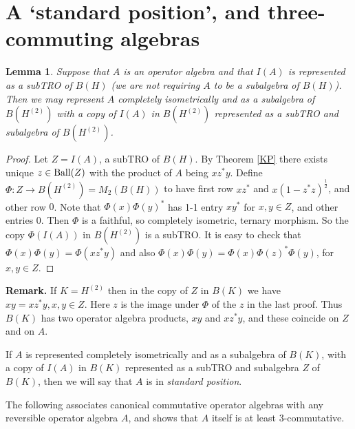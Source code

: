\documentclass{amsart}
\newtheorem{lemma}[theorem]{Lemma}
\theoremstyle{remark}
\theoremstyle{definition}
\numberwithin{equation}{section}
\begin{document}
\section{A `standard position', and three-commuting algebras}  \label{sp}

\begin{lemma} \label{both} Suppose that $A$ is an operator algebra and that $I(A)$ is represented as a subTRO of $B(H)$
(we are not requiring $A$ to be a subalgebra of $B(H)$).  Then 
we may represent $A$ completely isometrically and as a subalgebra of $B(H^{(2)})$ with a copy  of 
$I(A)$ in $B(H^{(2)})$ represented as a subTRO  and  subalgebra of $B(H^{(2)})$. \end{lemma}

\begin{proof}  Let $Z = I(A)$, a subTRO of $B(H)$.  By Theorem \ref{KP} there exists unique $z \in {\rm Ball}(Z)$ with
the product of $A$ being $x z^* y$. 
Define $\Phi : Z \to B(H^{(2)}) = M_2(B(H))$ to have first row $x z^*$ and $x(1-z^*z)^{\frac{1}{2}}$, and other row $0$.
Note that $\Phi(x) \Phi(y)^*$ has 1-1 entry $xy^*$ for $x,y \in Z$, and other entries 0.  Then $\Phi$ is a faithful, so  completely isometric, ternary morphism.  So the copy $\Phi(I(A))$  in $B(H^{(2)})$ is a subTRO. 
It is easy to check that $\Phi(x) \Phi(y) = \Phi(xz^* y)$ and also $\Phi(x) \Phi(y) =  \Phi(x) \Phi(z)^* \Phi(y)$, for $x,y \in Z$.
\end{proof}

{\bf Remark.}  If $K = H^{(2)}$   then in the copy of $Z$ in  $B(K)$ we have $xy = x z^* y, x, y \in Z$.   
Here $z$ is the image under $\Phi$ of the $z$ in the last proof.  Thus $B(K)$ has two  operator algebra 
products, $xy$ and  $x z^* y$, and these  coincide on $Z$ and on $A$.

\bigskip

If $A$ is  represented completely isometrically and as a subalgebra of $B(K)$, with a copy of 
$I(A)$ in $B(K)$ represented as a subTRO and subalgebra $Z$ of $B(K)$, then we will say that $A$ is in {\em standard position}.

The following associates canonical commutative operator algebras with any reversible operator algebra $A$, and shows that $A$ itself is at least 3-commutative. 
\end{document}
